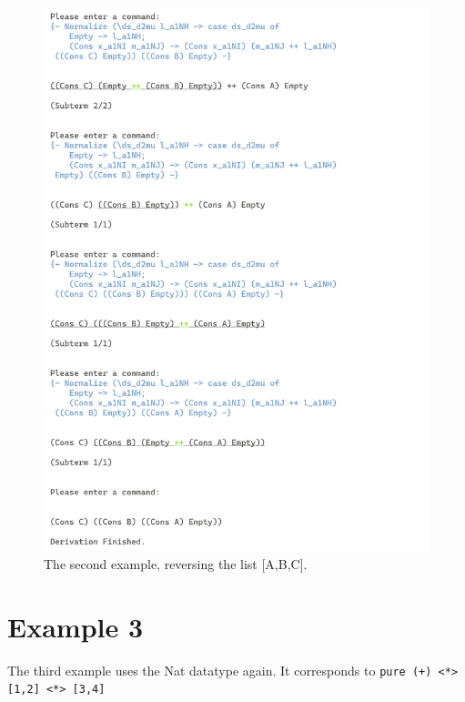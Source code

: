 \begin{figure}
    \includegraphics[width=1\textwidth]{resources/reverse_part_2.PNG}
    \caption{The second example, reversing the list [A,B,C].}
\end{figure}

\clearpage
\section{Example 3}
The third example uses the Nat datatype again.
It corresponds to \texttt{pure (+) <*> [1,2] <*> [3,4]}

